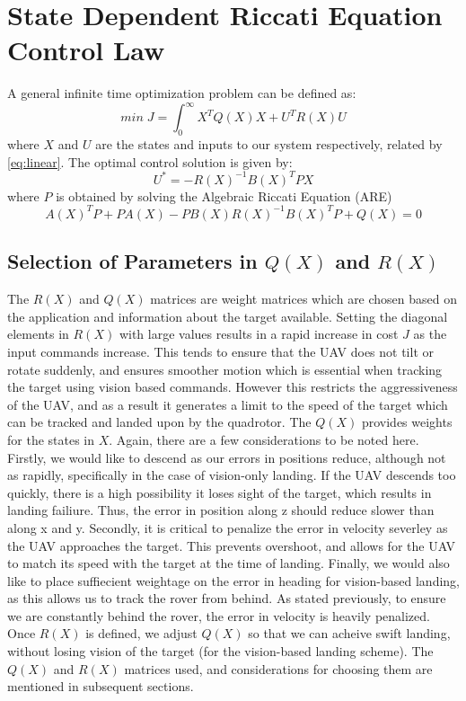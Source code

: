 \documentclass[conf]{new-aiaa}
\begin{document}
\section{State Dependent Riccati Equation Control Law}\label{sec:sdre}
A general infinite time optimization problem can be defined as:
\begin{equation}
min\; J = \int_{0}^{\infty}X^{T}Q(X)X + U^{T}R(X)U
\end{equation}
where $X$ and $U$ are the states and inputs to our system respectively, related by \eqref{eq:linear}. The optimal control solution is given by:
\begin{equation}
    U^{*} = -R(X)^{-1} B(X)^T P X
\end{equation}
where $P$ is obtained by solving the Algebraic Riccati Equation (ARE)
\begin{equation}
    A(X)^T P + PA(X) - PB(X)R(X)^{-1} B(X)^T P +Q(X) = 0
\end{equation}

\subsection{Selection of Parameters in $Q(X)$ and $R(X)$}

The $R(X)$ and $Q(X)$ matrices are weight matrices which are chosen based on the application and information about the target available. Setting the diagonal elements in $R(X)$ with large values results in a rapid increase in cost $J$ as the input commands increase. This tends to ensure that the UAV does not tilt or rotate suddenly, and ensures smoother motion which is essential when tracking the target using vision based commands. However this restricts the aggressiveness of the UAV, and as a result it generates a limit to the speed of the target which can be tracked and landed upon by the quadrotor. The $Q(X)$ provides weights for the states in $X$. Again, there are a few considerations to be noted here. Firstly, we would like to descend as our errors in positions reduce, although not as rapidly, specifically in the case of vision-only landing. If the UAV descends too quickly, there is a high possibility it loses sight of the target, which results in landing failiure. Thus, the error in position along z should reduce slower than along x and y. Secondly, it is critical to penalize the error in velocity severley as the UAV approaches the target. This prevents overshoot, and allows for the UAV to match its speed with the target at the time of landing. Finally, we would also like to place suffiecient weightage on the error in heading for vision-based landing, as this allows us to track the rover from behind. As stated previously, to ensure we are constantly behind the rover, the error in velocity is heavily penalized. Once $R(X)$ is defined, we adjust $Q(X)$ so that we can acheive swift landing, without losing vision of the target (for the vision-based landing scheme). The $Q(X)$ and $R(X)$ matrices used, and considerations for choosing them are mentioned in subsequent sections.
\end{document}
